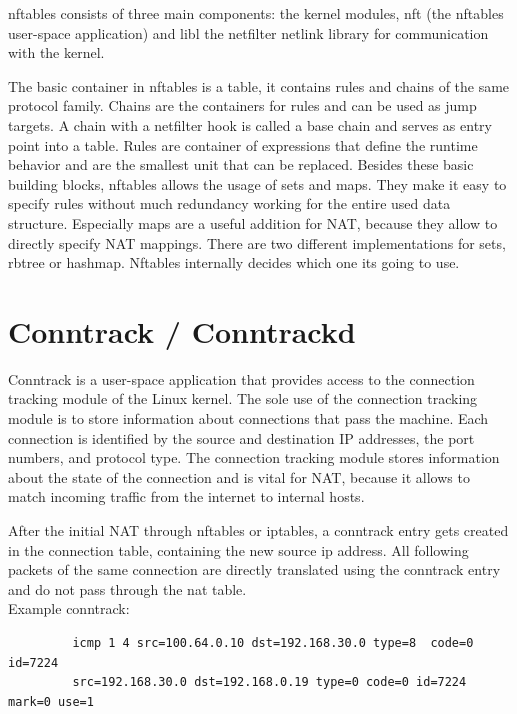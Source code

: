 \documentclass{report}
\begin{document}
nftables consists of three main components: the kernel modules, nft (the
nftables user-space application) and libl the netfilter netlink library
for communication with the kernel.

The basic container in nftables is a table, it contains rules and chains
of the same protocol family. Chains are the containers for rules and can
be used as jump targets. A chain with a netfilter hook is
called a base chain and serves as entry point into a table. Rules are
container of expressions that define the runtime behavior and are the
smallest unit that can be replaced. Besides these basic building blocks,
nftables allows the usage of sets and maps. They make it easy to specify
rules without much redundancy working for the entire used data structure.
Especially maps are a useful addition for NAT, because they allow to
directly specify NAT mappings. There are two different implementations
for sets, rbtree or hashmap. Nftables internally decides which one its
going to use.

\section{Conntrack / Conntrackd}\label{conntrack-conntrackd}

Conntrack\cite{conntrack-tools} is a user-space application that provides access to the
connection tracking module\cite{conntrackSys} of the Linux kernel. The sole use of the
connection tracking module is to store information about connections
that pass the machine. Each connection is identified by the source and
destination IP addresses, the port numbers, and protocol type. The
connection tracking module stores information about the state of the
connection and is vital for NAT, because it allows to match incoming
traffic from the internet to internal hosts.

After the initial NAT through nftables or iptables, a conntrack entry gets
created in the connection table, containing the new source ip address.
All following packets of the same connection are directly translated
using the conntrack entry and do not pass through the nat table. \\

Example conntrack:


\begin{verbatim}
         icmp 1 4 src=100.64.0.10 dst=192.168.30.0 type=8  code=0 id=7224
         src=192.168.30.0 dst=192.168.0.19 type=0 code=0 id=7224 mark=0 use=1
\end{verbatim}
\end{document}
